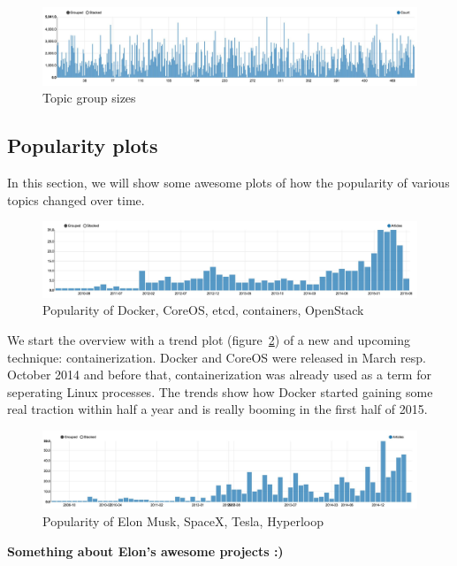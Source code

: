 \begin{figure}[H]
	\caption{Topic group sizes}
	\label{fig:topicsizes}
	\centering
	\includegraphics[width=14cm]{topicsizes}
\end{figure}

\subsection{Popularity plots}
In this section, we will show some awesome plots of how the popularity of various topics changed over time.

\begin{figure}[H]
	\caption{Popularity of Docker, CoreOS, etcd, containers, OpenStack}
	\label{fig:trend_docker}
	\centering
	\includegraphics[width=14cm]{topic_trends/docker}
\end{figure}
We start the overview with a trend plot (figure~\ref{fig:trend_docker}) of a new and upcoming technique: containerization. Docker and CoreOS were released in March resp. October 2014 and before that, containerization was already used as a term for seperating Linux processes. The trends show how Docker started gaining some real traction within half a year and is really booming in the first half of 2015.

\begin{figure}[H]
	\caption{Popularity of Elon Musk, SpaceX, Tesla, Hyperloop}
	\label{fig:trend_elon}
	\centering
	\includegraphics[width=14cm]{topic_trends/elon}
\end{figure}
\textbf{Something about Elon's awesome projects :)}

